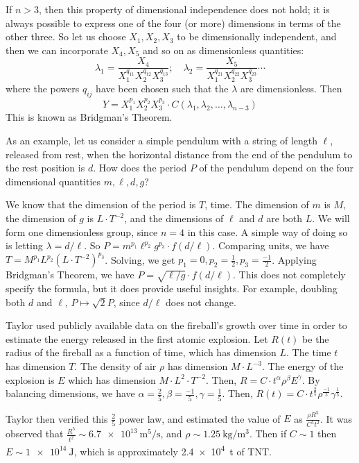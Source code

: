 If \(n > 3\), then this property of dimensional independence does not hold; it is always possible to express one of the four (or more) dimensions in terms of the other three.
So let us choose \(X_1, X_2, X_3\) to be dimensionally independent, and then we can incorporate \(X_4, X_5\) and so on as dimensionless quantities:
\[
	\lambda_1 = \frac{X_4}{X_1^{q_{11}}X_2^{q_{12}}X_3^{q_{13}}};\quad \lambda_2 = \frac{X_5}{X_1^{q_{21}}X_2^{q_{22}}X_3^{q_{23}}} \cdots
\]
where the powers \(q_{ij}\) have been chosen such that the \(\lambda\) are dimensionless.
Then
\[
	Y = X_1^{p_1}X_2^{p_2}X_3^{p_3} \cdot C(\lambda_1, \lambda_2, \dots, \lambda_{n-3})
\]
This is known as Bridgman's Theorem.

\begin{example}
	As an example, let us consider a simple pendulum with a string of length \(\ell\), released from rest, when the horizontal distance from the end of the pendulum to the rest position is \(d\).
	How does the period \(P\) of the pendulum depend on the four dimensional quantities \(m, \ell, d, g\)?

	We know that the dimension of the period is \(T\), time.
	The dimension of \(m\) is \(M\), the dimension of \(g\) is \(L \cdot T^{-2}\), and the dimensions of \(\ell\) and \(d\) are both \(L\).
	We will form one dimensionless group, since \(n=4\) in this case.
	A simple way of doing so is letting \(\lambda = d/\ell\).
	So \(P = m^{p_1} \ell^{p_2} g^{p_3} \cdot f(d/\ell)\).
	Comparing units, we have \(T = M^{p_1} L^{p_2} (L \cdot T^{-2})^{p_3}\).
	Solving, we get \(p_1 = 0, p_2 = \frac{1}{2}, p_3 = \frac{-1}{2}\).
	Applying Bridgman's Theorem, we have \(P = \sqrt{\ell / g} \cdot f(d/\ell)\).
	This does not completely specify the formula, but it does provide useful insights.
	For example, doubling both \(d\) and \(\ell\), \(P \mapsto \sqrt{2} P\), since \(d/\ell\) does not change.
\end{example}

\begin{example}
	Taylor used publicly available data on the fireball's growth over time in order to estimate the energy released in the first atomic explosion.
	Let \(R(t)\) be the radius of the fireball as a function of time, which has dimension \(L\).
	The time \(t\) has dimension \(T\).
	The density of air \(\rho\) has dimension \(M \cdot L^{-3}\).
	The energy of the explosion is \(E\) which has dimension \(M \cdot L^2 \cdot T^{-2}\).
	Then, \(R = C \cdot t^\alpha \rho^\beta E^\gamma\).
	By balancing dimensions, we have \(\alpha = \frac{2}{5}, \beta = \frac{-1}{5}, \gamma = \frac{1}{5}\).
	Then, \(R(t) = C \cdot t^{\frac{2}{5}} \rho^{\frac{-1}{5}} \gamma^{\frac{1}{5}}\).

	Taylor then verified this \(\frac{2}{5}\) power law, and estimated the value of \(E\) as \(\frac{\rho R^5}{C^5 t^2}\).
	It was observed that \(\frac{R^5}{t^2} \sim \SI{6.7e13}{\metre\tothe{5}\per\second}\), and \(\rho\sim\SI{1.25}{\kilogram\per\metre\cubed}\).
	Then if \(C \sim 1\) then \(E \sim \SI{1e14}{\joule}\), which is approximately \SI{2.4e4}{\tonne} of TNT.\@
\end{example}
